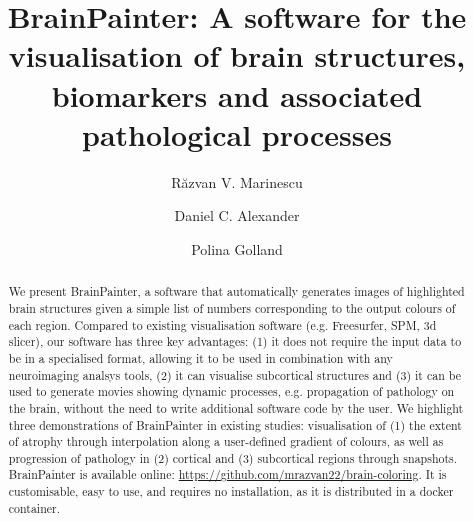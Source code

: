 \documentclass[final,times,twocolumn,authoryear]{elsarticle}
\begin{document}
\begin{frontmatter}

\title{BrainPainter: A software for the visualisation of brain structures, biomarkers and associated pathological processes}


\address[mit]{Computer Science and Artificial Intelligence Laboratory, Massachusetts Institute of Technology, Cambridge, USA, MA 02139}
\address[ucl]{Centre for Medical Image Computing, University College London, Gower Street, London, United Kingdom, WC1E 6BT
\frontFig
}

\author[mit,ucl]{R\u{a}zvan V. Marinescu}
\author[ucl]{Daniel C. Alexander}
\author[mit]{Polina Golland}

\begin{abstract}
We present BrainPainter, a software that automatically generates images of highlighted brain structures given a simple list of numbers corresponding to the output colours of each region. Compared to existing visualisation software (e.g. Freesurfer, SPM, 3d slicer), our software has three key advantages: (1) it does not require the input data to be in a specialised format, allowing it to be used in combination with any neuroimaging analsys tools, (2) it can visualise subcortical structures and (3) it can be used to generate movies showing dynamic processes, e.g. propagation of pathology on the brain, without the need to write additional software code by the user. We highlight three demonstrations of BrainPainter in existing studies: visualisation of (1) the extent of atrophy through interpolation along a user-defined gradient of colours, as well as progression of pathology in (2) cortical and (3) subcortical regions through snapshots. BrainPainter is available online: \url{https://github.com/mrazvan22/brain-coloring}. It is customisable, easy to use, and requires no installation, as it is distributed in a docker container.
\end{abstract}


\end{frontmatter}


\end{document}
